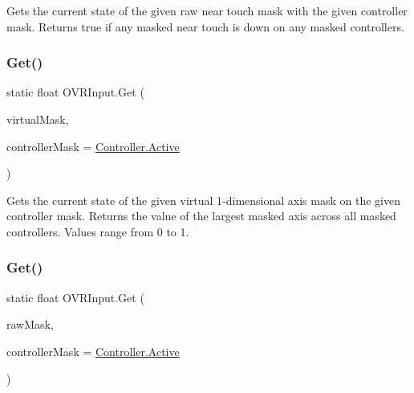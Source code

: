 Gets the current state of the given raw near touch mask with the given controller mask. Returns true if any masked near touch is down on any masked controllers. 

\mbox{\label{class_o_v_r_input_a32afd2d0bf3c8fa6332f685745de380a}} 
\subsubsection{\texorpdfstring{Get()}{Get()}\hspace{0.1cm}{\footnotesize\ttfamily [7/10]}}
{\footnotesize\ttfamily static float O\+V\+R\+Input.\+Get (\begin{DoxyParamCaption}\item[{\mbox{\hyperlink{class_o_v_r_input_af5c3e63489ca9ee2e5db3a657f7f27f6}{Axis1D}}}]{virtual\+Mask,  }\item[{\mbox{\hyperlink{class_o_v_r_input_a5c86f9052a9cbb0b73779ff5704d60a8}{Controller}}}]{controller\+Mask = {\ttfamily \mbox{\hyperlink{class_o_v_r_input_a5c86f9052a9cbb0b73779ff5704d60a8a4d3d769b812b6faa6b76e1a8abaece2d}{Controller.\+Active}}} }\end{DoxyParamCaption})\hspace{0.3cm}{\ttfamily [static]}}



Gets the current state of the given virtual 1-\/dimensional axis mask on the given controller mask. Returns the value of the largest masked axis across all masked controllers. Values range from 0 to 1. 

\mbox{\label{class_o_v_r_input_ace9bc5cb3f2817fffc28d58564890133}} 
\subsubsection{\texorpdfstring{Get()}{Get()}\hspace{0.1cm}{\footnotesize\ttfamily [8/10]}}
{\footnotesize\ttfamily static float O\+V\+R\+Input.\+Get (\begin{DoxyParamCaption}\item[{\mbox{\hyperlink{class_o_v_r_input_a9c9eff2910ca07d1fb0e924273ebefaf}{Raw\+Axis1D}}}]{raw\+Mask,  }\item[{\mbox{\hyperlink{class_o_v_r_input_a5c86f9052a9cbb0b73779ff5704d60a8}{Controller}}}]{controller\+Mask = {\ttfamily \mbox{\hyperlink{class_o_v_r_input_a5c86f9052a9cbb0b73779ff5704d60a8a4d3d769b812b6faa6b76e1a8abaece2d}{Controller.\+Active}}} }\end{DoxyParamCaption})\hspace{0.3cm}{\ttfamily [static]}}



